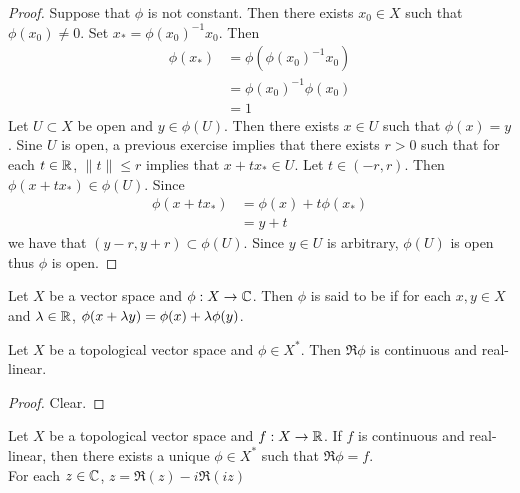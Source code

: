 \documentclass{book}
\begin{document}
	\begin{proof}
		Suppose that $\phi$ is not constant. Then there exists $x_0 \in X$ such that $\phi(x_0) \neq 0$. Set $x_* = \phi(x_0)^{-1} x_0$. Then
		\begin{align*}
			\phi(x_*)
			&= \phi(\phi(x_0)^{-1}x_0) \\
			&= \phi(x_0)^{-1}\phi(x_0) \\
			&= 1
		\end{align*}
		Let $U \subset X$ be open and $y \in \phi(U)$. Then there exists $x \in U$ such that $\phi(x) = y$. Sine $U$ is open, a previous exercise implies that there exists $r > 0$ such that for each $t \in \mathbb{R}$, $\|t\| \leq r$ implies that $x + tx_* \in U$. Let $t \in (-r, r)$. Then $\phi(x+ tx_*) \in \phi(U)$. Since 
		\begin{align*}
			\phi(x+ tx_*) 
			&= \phi(x) + t\phi(x_*) \\
			&= y + t
		\end{align*}
	we have that $(y-r, y+r) \subset \phi(U)$. Since $y \in U$ is arbitrary, $\phi(U)$ is open thus $\phi$ is open. 
	\end{proof}

	\begin{defn}
		Let $X$ be a vector space and $\phi: X \rightarrow \mathbb{C}$. Then $\phi$ is said to be  if for each $x,y \in X$ and $\lambda \in \mathbb{R}$, $\phi(x+ \lambda y) = \phi(x) + \lambda \phi(y)$.
	\end{defn}

	\begin{ex}
		Let $X$ be a topological vector space and $\phi \in X^*$. Then $\Re \phi$ is continuous and real-linear. 
	\end{ex}

	\begin{proof}
		Clear.
	\end{proof}

	\begin{ex}
		Let $X$ be a topological vector space and $f:X \rightarrow \mathbb{R}$. If $f$ is continuous and real-linear, then there exists a unique $\phi \in X^*$ such that $\Re \phi = f$. \\
		 For each $z \in \mathbb{C}$, $z = \Re(z) - i \Re(iz)$
	\end{ex}
	
\end{document}

